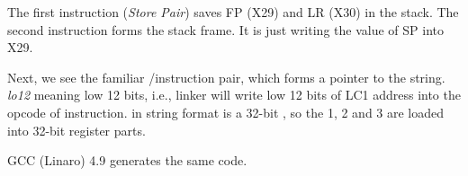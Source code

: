 



The first instruction  (\emph{Store Pair}) saves \ac{FP} (X29) and \ac{LR} (X30) in the stack.
The second  instruction forms the stack frame.
It is just writing the value of \ac{SP} into X29.

Next, we see the familiar /\ADD instruction pair, which forms a pointer to the string.
\emph{lo12} meaning low 12 bits, i.e., linker will write low 12 bits of LC1 address into the opcode of \ADD instruction.
 in \printf string format is a 32-bit \Tint, so the 1, 2 and 3 are loaded into 32-bit register parts.

\Optimizing GCC (Linaro) 4.9 generates the same code.

